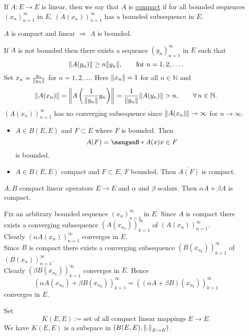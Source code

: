 
\begin{definition}[compact]
	If $A: E \to E$ is linear, then we say that $A$ is \underline{compact} if for all bounded sequences $(x_n)_{n=1}^{\infty}$ in $E$, $ (A(x_n))_{n=1}^{\infty}$ has a bounded subsequence in $E$.
\end{definition}

\begin{lemma}
	$A$ is compact and linear \qquad  $\Rightarrow $ \qquad  $A$ is bounded.
\end{lemma}
\begin{beweis}
	If $A$ is not bounded then there exists a sequence $(y_n)_{n=1}^{\infty}$ in $E$ such that
	\[
		\norm{A(y_n)} \geq n \norm{y_n}, \qquad \text{for }n=1,2,\dots.
	\]
	Set $x_n = \frac{y_n}{\norm{y_n}}$ for $n = 1,2,\dots$. Here $\norm{x_n}=1$ for all $n \in \mathbb{N}$ and 
	\[
		\norm{A(x_n)} = \norm{A \left( \frac{1}{\norm{y_n}}y_n \right)} = \frac{1}{\norm{y_n}} \norm{A(y_n)} >n, \qquad \forall\, n \in \mathbb{N}.
	\]
	$(A(x_n))_{n=1}^{\infty}$ has no converging subsequence since $\norm{A(x_n)} \to \infty$ for $n \to \infty$.
\end{beweis}
\begin{bemerkung}
	\begin{itemize}
		\item $A \in B(E,E)$ and $F \subset E$ where $F$ is bounded. Then
		\[
			A(F) = \set[A(x)]{x \in F} 
		\]
		is bounded.
		\item $A \in B(E,E)$ compact and $F \subset E$, $F$ bounded. Then $\overline{A(F)}$ is compact.
	\end{itemize}
\end{bemerkung}

\begin{lemma}
	$A,B$ compact linear operators $E \to E$ and $\alpha$ and $\beta$ scalars. Then $\alpha A+ \beta A$ is compact.
\end{lemma}
\begin{beweis}
	Fix an arbitrary bounded sequence $(x_n)_{n=1}^{\infty}$ in $E$. Since $A$ is compact there exists a converging subsequence $(A(x_{n_k}))_{k=1}^{\infty}$ of $(A(x_n))_{n=1}^{\infty}$. \\ Clearly $(\alpha A(x_n))_{n=1}^{\infty}$ converges in $E$. \\ Since $B$ is compact there exists a converging subsequence $(B(x_{n_k}))_{k=1}^{\infty}$ of $(B(x_n))_{n=1}^{\infty}$.  \\ Clearly $(\beta B(x_{n_k}))_{k=1}^{\infty}$ converges in $E$. Hence
	\[
		\left( \alpha A(x _{n_k}) + \beta B(x _{n_k}) \right)_{k=1}^{\infty} = \left( (\alpha A + \beta B)(x _{n_k}) \right)_{k=1}^{\infty}
	\]
	converges in $E$.
\end{beweis} 
Set \[
	K(E,E) := \text{set of all compact linear mappings $E \to E$}.
\]
We have $K(E,E)$ is a subspace in $(B(E,E), \norm{.}_{E \to E})$.

